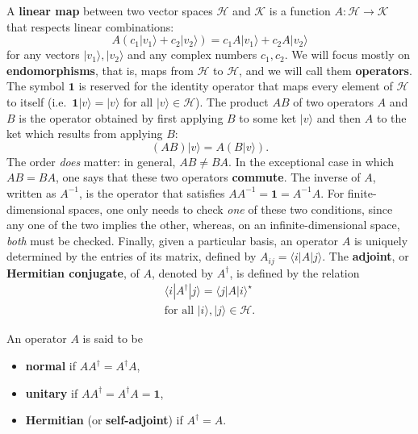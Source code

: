 \documentclass[fleqn]{article}
\providecommand{\tightlist}{%
  \setlength{\itemsep}{0pt}\setlength{\parskip}{0pt}}
\begin{document}
A \textbf{linear map} between two vector spaces \(\mathcal{H}\) and \(\mathcal{K}\) is a function \(A\colon\mathcal{H}\to\mathcal{K}\) that respects linear combinations:
\[
  A(c_1|v_1\rangle+c_2|v_2\rangle)=c_1 A|v_1\rangle+c_2 A|v_2\rangle
\]
for any vectors \(|v_1\rangle,|v_2\rangle\) and any complex numbers \(c_1,c_2\).
We will focus mostly on \textbf{endomorphisms}, that is, maps from \(\mathcal{H}\) to \(\mathcal{H}\), and we will call them \textbf{operators}.
The symbol \(\mathbf{1}\) is reserved for the identity operator that maps every element of \(\mathcal{H}\) to itself (i.e.~\(\mathbf{1}|v\rangle=|v\rangle\) for all \(|v\rangle\in\mathcal{H}\)).
The product \(AB\) of two operators \(A\) and \(B\) is the operator obtained by first applying \(B\) to some ket \(|v\rangle\) and then \(A\) to the ket which results from applying \(B\):
\[
  (AB)|v\rangle = A(B|v\rangle).
\]
The order \emph{does} matter: in general, \(AB\neq BA\).
In the exceptional case in which \(AB=BA\), one says that these two operators \textbf{commute}.
The inverse of \(A\), written as \(A^{-1}\), is the operator that satisfies \(AA^{-1}=\mathbf{1}=A^{-1}A\).
For finite-dimensional spaces, one only needs to check \emph{one} of these two conditions, since any one of the two implies the other, whereas, on an infinite-dimensional space, \emph{both} must be checked.
Finally, given a particular basis, an operator \(A\) is uniquely determined by the entries of its matrix, defined by \(A_{ij}=\langle i|A|j\rangle\).
The \textbf{adjoint}, or \textbf{Hermitian conjugate}, of \(A\), denoted by \(A^\dagger\), is defined by the relation
\[
  \begin{gathered}
    \langle i|A^\dagger|j\rangle
    = \langle j|A|i\rangle^\star
  \\\text{for all $|i\rangle,|j\rangle\in\mathcal{H}$}.
  \end{gathered}
\]

An operator \(A\) is said to be

\begin{itemize}
\tightlist
\item
  \textbf{normal} if \(AA^\dagger = A^\dagger A\),
\item
  \textbf{unitary} if \(AA^\dagger = A^\dagger A = \mathbf{1}\),
\item
  \textbf{Hermitian} (or \textbf{self-adjoint}) if \(A^\dagger = A\).
\end{itemize}
\end{document}
